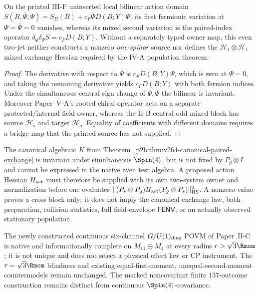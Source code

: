 \documentclass[11pt,a4paper]{article}
\begin{document}
\begin{proposition}
\label{p2f:prop:v264-action-jet-obstruction}
On the printed III-F uninserted local bilinear action domain
$S(B,\bar\Psi,\Psi)=S_B(B)+c_F\bar\Psi D(B;Y)\Psi$,
its first fermionic variation at $\Psi=\bar\Psi=0$ vanishes,
whereas its mixed second variation is the paired-index operator
$\delta_{\bar\Psi}\delta_\Psi S=c_FD(B;Y)$.
Without a separately typed owner map, this even two-jet neither
constructs a nonzero \emph{one-spinor} source nor defines the
$\mathcal H_1\otimes\mathcal H_1$ mixed exchange Hessian required
by the IV-A population theorem.
\end{proposition}
\begin{proof}
The derivative with respect to $\bar\Psi$ is
$c_FD(B;Y)\Psi$, which is zero at $\Psi=0$, and taking the
remaining derivative yields $c_FD(B;Y)$ with both fermion indices.
Under the simultaneous central sign change of $\Psi,\bar\Psi$ the
bilinear is invariant. Moreover Paper~V-A's rooted chiral operator
acts on a separate protected/internal field owner, whereas the II-B
central-odd mixed block has source $\mathcal H_s$ and target
$\mathcal H_g$. Equality of coefficients with different domains
requires a bridge map that the printed source has not supplied.
\end{proof}

\begin{remark}
\label{p2f:rem:v264-action-pair-cert-status}
The canonical algebraic $K$ from
Theorem~\ref{p2b:thm:v264-canonical-paired-exchange} is invariant
under simultaneous $\Spin(4)$, but is not fixed by
$P_g\otimes I$ and cannot be expressed in the native even test
algebra. A proposed action Hessian $H_{\rm act}$ must therefore
be supplied with its own two-system owner and normalization before
one evaluates
$\|(P_s\otimes P_g)H_{\rm act}(P_g\otimes P_s)\|_{\rm HS}^2$.
A nonzero value proves a cross block only; it does not imply the
canonical exchange law, bath preparation, collision statistics,
full field-envelope $\mathsf{FENV}$, or an actually observed
stationary population.
\end{remark}

\begin{remark}
\label{p2f:rem:v270-homogeneous-readout-firewall}
The newly constructed continuous six-channel $G/U(1)_{\rm diag}$
POVM of Paper~II-C is native and informationally complete on
$M_{11}\oplus M_4$ at every radius $r>\sqrt3\Rmom$; it is not
unique and does not select a physical effect law or CP instrument.
The $r=\sqrt3\Rmom$ blindness and existing equal-first-moment,
unequal-second-moment countermodels remain unchanged. The marked
noncovariant finite $137$-outcome construction remains distinct from
continuous $\Spin(4)$-covariance.
\end{remark}
\end{document}
